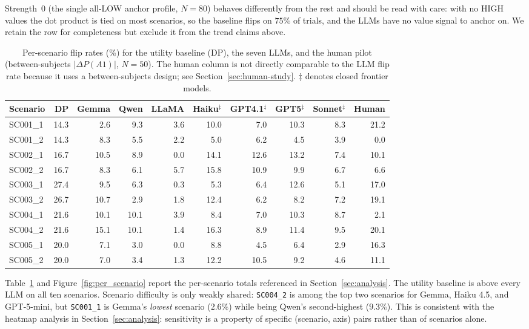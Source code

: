 Strength~0 (the single all-LOW anchor profile, $N=80$) behaves differently from the rest and should be read with care: with no HIGH values the dot product is tied on most scenarios, so the baseline flips on $75\%$ of trials, and the LLMs have no value signal to anchor on. We retain the row for completeness but exclude it from the trend claims above.

\begin{table}[t]
\centering
\footnotesize
\setlength{\tabcolsep}{4pt}
\begin{tabular}{@{}lrrrrrrrrr@{}}
\toprule
\textbf{Scenario} & \textbf{DP} & \textbf{Gemma} & \textbf{Qwen} & \textbf{LLaMA} & \textbf{Haiku}$^\ddagger$ & \textbf{GPT4.1}$^\ddagger$ & \textbf{GPT5}$^\ddagger$ & \textbf{Sonnet}$^\ddagger$ & \textbf{Human} \\
\midrule
SC001\_1 & 14.3 & 2.6 & 9.3 & 3.6 & 10.0 & 7.0 & 10.3 & 8.3 & 21.2 \\
SC001\_2 & 14.3 & 8.3 & 5.5 & 2.2 & 5.0 & 6.2 & 4.5 & 3.9 & 0.0 \\
SC002\_1 & 16.7 & 10.5 & 8.9 & 0.0 & 14.1 & 12.6 & 13.2 & 7.4 & 10.1 \\
SC002\_2 & 16.7 & 8.3 & 6.1 & 5.7 & 15.8 & 10.9 & 9.9 & 6.7 & 6.6 \\
SC003\_1 & 27.4 & 9.5 & 6.3 & 0.3 & 5.3 & 6.4 & 12.6 & 5.1 & 17.0 \\
SC003\_2 & 26.7 & 10.7 & 2.9 & 1.8 & 12.4 & 6.2 & 8.2 & 7.2 & 19.1 \\
SC004\_1 & 21.6 & 10.1 & 10.1 & 3.9 & 8.4 & 7.0 & 10.3 & 8.7 & 2.1 \\
SC004\_2 & 21.6 & 15.1 & 10.1 & 1.4 & 16.3 & 8.9 & 11.4 & 9.5 & 20.1 \\
SC005\_1 & 20.0 & 7.1 & 3.0 & 0.0 & 8.8 & 4.5 & 6.4 & 2.9 & 16.3 \\
SC005\_2 & 20.0 & 7.0 & 3.4 & 1.3 & 12.2 & 10.5 & 9.2 & 4.6 & 11.1 \\
\bottomrule
\end{tabular}
\caption{Per-scenario flip rates (\%) for the utility baseline (DP), the seven LLMs, and the human pilot (between-subjects $|\Delta P(A1)|$, $N=50$). The human column is not directly comparable to the LLM flip rate because it uses a between-subjects design; see Section~\ref{sec:human-study}. $\ddagger$ denotes closed frontier models.}
\label{tab:per_scenario}
\end{table}

Table~\ref{tab:per_scenario} and Figure~\ref{fig:per_scenario} report the per-scenario totals referenced in Section~\ref{sec:analysis}. The utility baseline is above every LLM on all ten scenarios. Scenario difficulty is only weakly shared: \texttt{SC004\_2} is among the top two scenarios for Gemma, Haiku 4.5, and GPT-5-mini, but \texttt{SC001\_1} is Gemma's \emph{lowest} scenario ($2.6\%$) while being Qwen's second-highest ($9.3\%$). This is consistent with the heatmap analysis in Section~\ref{sec:analysis}: sensitivity is a property of specific (scenario, axis) pairs rather than of scenarios alone.

